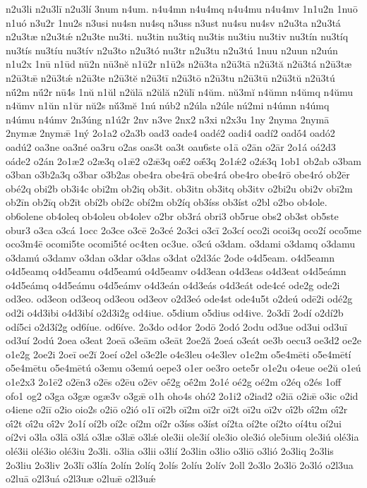 {n2u3li
n2u3lī
n2u3lí
3num
n4um.
n4u4mn
n4u4mq
n4u4mu
n4u4mv
1n1u2n
1nuō
n1uó
n3u2r
1nu2s
n3usi
nu4sn
nu4sq
n3uss
n3ust
nu4su
nu4sv
n2u3ta
n2u3tá
n2u3tæ
n2u3tǽ
n2u3te
nu3ti.
nu3tin
nu3tiq
nu3tis
nu3tiu
nu3tiv
nu3tín
nu3tíq
nu3tís
nu3tíu
nu3tív
n2u3to
n2u3tó
nu3tr
n2u3tu
n2u3tú
1nuu
n2uun
n2uún
n1u2x
1nū
n1ūd
nū2n
nū3nĕ
n1ū2r
n1ū2s
n2ū3ta
n2ū3tā
n2ū3tă
n2ū3tá
n2ū3tæ
n2ū3tǣ
n2ū3tǽ
n2ū3te
n2ū3tĕ
n2ū3tī
n2ū3tō
n2ū3tu
n2ū3tū
n2ū3tŭ
n2ū3tú
nū́2m
nū́2r
nū4́s
1nŭ
n1ŭl
n2ŭlā
n2ŭlă
n2ŭlī
n4ŭm.
nŭ3mĭ
n4ŭmn
n4ŭmq
n4ŭmu
n4ŭmv
n1ŭn
n1ŭr
nŭ2s
nŭ́3mĕ
1nú
núb2
n2úla
n2úle
nú2mi
n4úmn
n4úmq
n4úmu
n4úmv
2n3úng
n1ú2r
2nv
n3ve
2nx2
n3xi
n2x3u
1ny
2nyma
2nymā
2nymæ
2nymǣ
1ný
2o1a2
o2a3b
oad3
oade4
oadé2
oadi4
oadí2
oadṓ4
oadó2
oadú2
oa3ne
oa3né
oa3ru
o2as
oas3t
oa3t
oau6ste
o1ā
o2ān
o2ār
2o1á
oá2d3
oáde2
o2án
2o1æ2
o2æ3q
o1ǣ2
o2ǣ3q
oǣ́2
oǣ́3q
2o1ǽ2
o2ǽ3q
1ob1
ob2ab
o3bam
o3ban
o3b2a3q
o3bar
o3b2as
obe4ra
obe4rā
obe4rá
obe4ro
obe4rō
obe4ró
ob2ēr
obé2q
obi2b
ob3i4c
obi2m
ob2iq
ob3it.
ob3itn
ob3itq
ob3itv
o2bi2u
obi2v
obī2m
ob2īn
ob2īq
ob2īt
obí2b
obí2c
obí2m
ob2íq
ob3íss
ob3íst
o2bl
o2bo
ob4ole.
ob6olene
ob4oleq
ob4oleu
ob4olev
o2br
ob3rá
obri3
ob5rue
obs2
ob3st
ob5ste
obur3
o3ca
o3cá
1occ
2o3ce
o3cē
2o3cé
2o3ci
o3cī
2o3cí
oco2i
ocoi3q
oco2í
oco5me
oco3m4ē
ocomi5te
ocomi5té
oc4ten
oc3ue.
o3cú
o3dam.
o3dami
o3damq
o3damu
o3damú
o3damv
o3dan
o3dar
o3das
o3dat
o2d3ác
2ode
o4d5eam.
o4d5eamn
o4d5eamq
o4d5eamu
o4d5eamú
o4d5eamv
o4d3ean
o4d3eas
o4d3eat
o4d5eámn
o4d5eámq
o4d5eámu
o4d5eámv
o4d3eán
o4d3eás
o4d3eát
ode4cé
ode2g
ode2i
od3eo.
od3eon
od3eoq
od3eou
od3eov
o2d3eó
ode4st
ode4u5t
o2deú
odē2i
odé2g
od2i
o4d3ibi
o4d3ibí
o2d3i2g
od4iue.
o5dium
o5dius
od4ive.
2o3dī
2odí
o2dí2b
odí5ci
o2d3í2g
od6íue.
od6íve.
2o3do
od4or
2odō
2odó
2odu
od3ue
od3ui
od3uī
od3uí
2odú
2oea
o3eat
2oeā
o3eām
o3eāt
2oe2ă
2oeá
o3eát
oe3b
oecu3
oe3d2
oe2e
o1e2g
2oe2i
2oeī
oe2ĭ
2oeí
o2el
o3e2le
o4e3leu
o4e3lev
o1e2m
o5e4mēti
o5e4mētí
o5e4mētu
o5e4mētú
o3emu
o3emú
oepe3
o1er
oe3ro
oete5r
o1e2u
o4eue
oe2ŭ
o1eú
o1e2x3
2o1ē2
o2ēn3
o2ēs
o2ēu
o2ēv
oḗ2g
oḗ2m
2o1é
oé2g
oé2m
o2éq
o2és
1off
ofo1
og2
o3ga
o3gæ
ogæ3v
o3gǣ
o1h
oho4s
ohó2
2o1i2
o2iad2
o2iā
o2iǣ
o3ic
o2id
o4iene
o2iī
o2io
oio2s
o2iō
o2ió
o1ī
oī2b
oī2m
oī2r
oī2t
oī2u
oī2v
oī́2b
oī́2m
oī́2r
oī́2t
oī́2u
oī́2v
2o1í
oí2b
oí2c
oí2m
oí2r
o3íss
o3íst
oí2ta
oí2te
oí2to
oí4tu
oí2ui
oí2vi
o3la
o3lā
o3lá
o3læ
o3lǣ
o3lǽ
ole3ii
ole3ií
ole3io
ole3ió
ole5ium
ole3iú
olé3ia
olé3ii
olé3io
olé3iu
2o3li.
o3lia
o3lii
o3lií
2o3lin
o3lio
o3liō
o3lió
2o3liq
2o3lis
2o3liu
2o3liv
2o3lī
o3lía
2olín
2olíq
2olís
2olíu
2olív
2oll
2o3lo
2o3lō
2o3ló
o2l3ua
o2luā
o2l3uá
o2l3uæ
o2luǣ
o2l3uǽ
}
